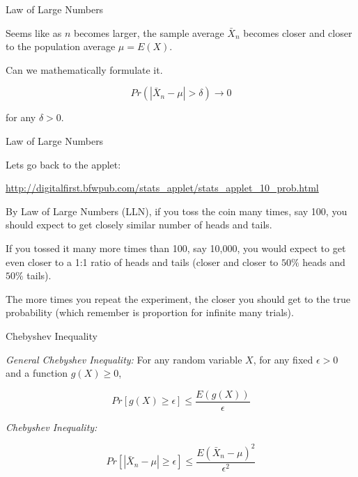 \documentclass{beamer}\usepackage[]{graphicx}\usepackage[]{color}
\begin{document}
\begin{frame}[fragile]{Law of Large Numbers \;\;}

Seems like as $n$ becomes larger, the sample average $\bar{X}_{n}$ becomes closer and closer to the population average $\mu= E(X)$. \pause \newline

Can we mathematically formulate it.

$$ Pr ( \left | \bar{X}_{n} - \mu \right | > \delta) \rightarrow 0 $$

for any $\delta > 0 $.

\end{frame}

\begin{frame}[fragile]{Law of Large Numbers \;\;}

Lets go back to the applet:

\url{http://digitalfirst.bfwpub.com/stats_applet/stats_applet_10_prob.html}
\pause \newline

By Law of Large Numbers (LLN), if you toss the coin many times, say 100, you should expect to get closely similar number of heads and tails.  \pause \newline

If you tossed it many more times than 100, say 10,000, you would expect to
get even closer to a 1:1 ratio of heads and tails (closer and closer
to $50\%$ heads and $50 \%$ tails). \pause \newline

The more times you repeat the experiment, the closer you should get to the true probability (which remember is proportion for infinite many trials).

\end{frame}

\begin{frame}[fragile]{Chebyshev Inequality \;\;}

\emph{General Chebyshev Inequality:}  For any random variable $X$, for any fixed $\epsilon>0$ and a function $g(X) \geq 0$,

$$ Pr [ g(X) \geq \epsilon ] \leq \frac { E (g(X)) }{\epsilon} $$

\emph{Chebyshev Inequality:}

$$ Pr [ \left | \bar{X}_{n} - \mu \right | \geq \epsilon ] \leq \frac{E(\bar{X}_{n} - \mu)^2}{\epsilon^2}  $$

\end{frame}
\end{document}
